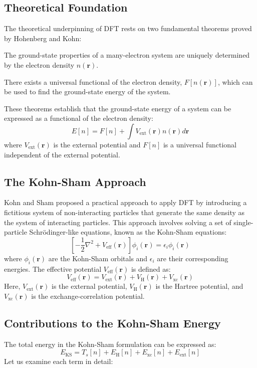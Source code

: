 \subsection{Theoretical Foundation}
The theoretical underpinning of DFT rests on two fundamental theorems proved by Hohenberg and Kohn:
\begin{theorem}
The ground-state properties of a many-electron system are uniquely determined by the electron density $n(\mathbf{r})$.
\end{theorem}
\begin{theorem}
There exists a universal functional of the electron density, $F[n(\mathbf{r})]$, which can be used to find the ground-state energy of the system.
\end{theorem}
These theorems establish that the ground-state energy of a system can be expressed as a functional of the electron density:
\begin{equation}
E[n] = F[n] + \int V_{\text{ext}}(\mathbf{r})n(\mathbf{r})d\mathbf{r}
\end{equation}
where $V_{\text{ext}}(\mathbf{r})$ is the external potential and $F[n]$ is a universal functional independent of the external potential.
\subsection{The Kohn-Sham Approach}
Kohn and Sham proposed a practical approach to apply DFT by introducing a fictitious system of non-interacting particles that generate the same density as the system of interacting particles. This approach involves solving a set of single-particle Schrödinger-like equations, known as the Kohn-Sham equations:
\begin{equation}
\left[-\frac{1}{2}\nabla^2 + V_{\text{eff}}(\mathbf{r})\right]\phi_i(\mathbf{r}) = \epsilon_i\phi_i(\mathbf{r})
\end{equation}
where $\phi_i(\mathbf{r})$ are the Kohn-Sham orbitals and $\epsilon_i$ are their corresponding energies. The effective potential $V_{\text{eff}}(\mathbf{r})$ is defined as:
\begin{equation}
V_{\text{eff}}(\mathbf{r}) = V_{\text{ext}}(\mathbf{r}) + V_{\text{H}}(\mathbf{r}) + V_{\text{xc}}(\mathbf{r})
\end{equation}
Here, $V_{\text{ext}}(\mathbf{r})$ is the external potential, $V_{\text{H}}(\mathbf{r})$ is the Hartree potential, and $V_{\text{xc}}(\mathbf{r})$ is the exchange-correlation potential.
\subsection{Contributions to the Kohn-Sham Energy}
The total energy in the Kohn-Sham formulation can be expressed as:
\begin{equation}
E_{\text{KS}} = T_s[n] + E_{\text{H}}[n] + E_{\text{xc}}[n] + E_{\text{ext}}[n]
\end{equation}
Let us examine each term in detail:
